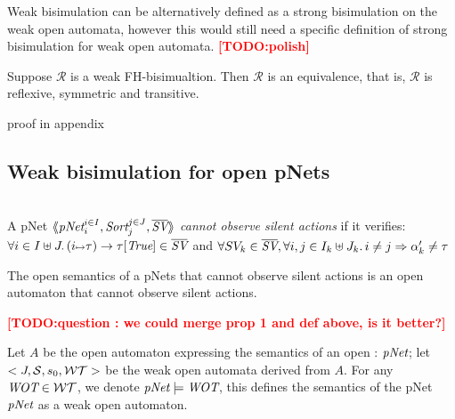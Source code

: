 \documentclass{lncs/llncs}
\newcommand{\TODO}[1]{\textcolor{red}{\textbf{[TODO:#1]}}}
\begin{document}
Weak bisimulation can be alternatively defined as a strong bisimulation on the weak open automata, however this would still need a specific definition of strong bisimulation for weak open automata. \TODO{polish}



\begin{theorem}\label{thm-weak-equiv} Suppose $\mathcal{R}$ 
is a weak FH-bisimualtion. Then $\mathcal{R}$ is an equivalence, that is, $\mathcal{R}$ is 
reflexive, symmetric and transitive.
\end{theorem}
proof in appendix



\subsection{Weak bisimulation for open pNets}
\begin{definition}~\\
A pNet $\mylangle \pNet_i^{i\in I} , \Sort_j^{j\in J}, \overline{\symb{SV}}\myrangle$
 \emph{cannot observe silent actions} if it verifies:\\ $\forall i\in I\uplus J.\, \SV{(i\mapsto \tau)}{\tau}{\symb{True}}\in \overline{\symb{SV}}$ and $\forall SV_k\in \overline{\symb{SV}}, \forall i,j\in I_k\uplus J_k.\,i\neq j \Rightarrow \alpha'_k\neq\tau$
\end{definition}

\begin{property}
The open semantics of a pNets that cannot observe silent actions is an open automaton that  cannot observe silent actions.
\end{property}

\TODO{question : we could merge prop 1 and def above, is it better?}

\begin{definition}
Let $A$ be the open automaton expressing the semantics of an open \pNet: $\pNet$; let $<J,\mathcal{S},s_0,  \mathcal{WT}>$ be the weak open automata derived from $A$. For any $\WOT\in\WT$, we denote $\pNet \models \WOT$, this defines the semantics of the pNet $\pNet$ as a weak open automaton.
\end{definition}

\end{document}
